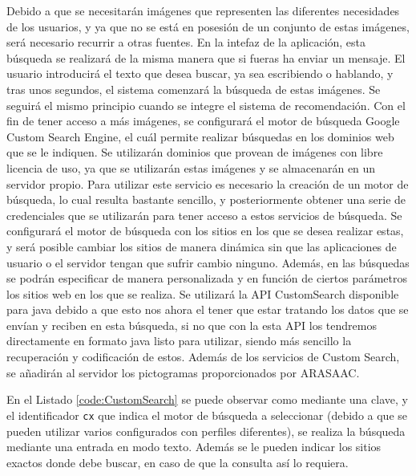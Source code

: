 Debido a que se necesitarán imágenes que representen las diferentes necesidades de los usuarios, y ya que no se está en posesión de un conjunto de estas imágenes, será necesario recurrir a otras fuentes. En la intefaz de la aplicación, esta búsqueda se realizará de la misma manera que si fueras ha enviar un mensaje. El usuario introducirá el texto que desea buscar, ya sea escribiendo o hablando, y tras unos segundos, el sistema comenzará la búsqueda de estas imágenes. Se seguirá el mismo principio cuando se integre el sistema de recomendación. Con el fin de tener acceso a más imágenes, se configurará el motor de búsqueda Google Custom Search Engine, el cuál permite realizar búsquedas en los dominios web que se le indiquen. Se utilizarán dominios que provean de imágenes con libre licencia de uso, ya que se utilizarán estas imágenes y se almacenarán en un servidor propio. Para utilizar este servicio es necesario la creación de un motor de búsqueda, lo cual resulta bastante sencillo, y posteriormente obtener una serie de credenciales que se utilizarán para tener acceso a estos servicios de búsqueda. Se configurará el motor de búsqueda con los sitios en los que se desea realizar estas, y será posible cambiar los sitios de manera dinámica sin que las aplicaciones de usuario o el servidor tengan que sufrir cambio ninguno. Además, en las búsquedas se podrán especificar de manera personalizada y en función de ciertos parámetros los sitios web en los que se realiza. Se utilizará la \ac{API} CustomSearch disponible para java debido a que esto nos ahora el tener que estar tratando los datos que se envían y reciben en esta búsqueda, si no que con la esta \ac{API} los tendremos directamente en formato java listo para utilizar, siendo más sencillo la recuperación y codificación de estos. Además de los servicios de Custom Search, se añadirán al servidor los pictogramas proporcionados por ARASAAC.


En el Listado \ref{code:CustomSearch} se puede observar como mediante una clave, y el identificador \texttt{cx} que indica el motor de búsqueda a seleccionar (debido a que se pueden utilizar varios configurados con perfiles diferentes), se realiza la búsqueda mediante una entrada en modo texto. Además se le pueden indicar los sitios exactos donde debe buscar, en caso de que la consulta así lo requiera.\\





